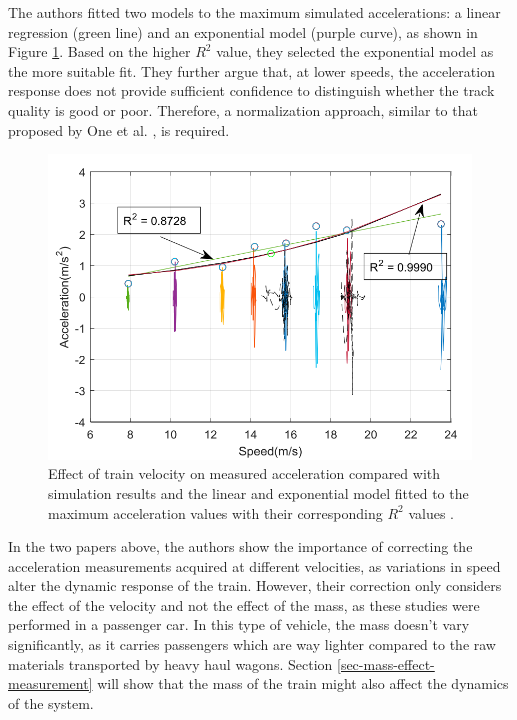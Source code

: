 The authors fitted two models to the maximum simulated accelerations: a linear regression (green line) and an exponential model (purple curve), as shown in Figure \ref{fig:vel_effect_balouchi}. Based on the higher $R^2$ value, they selected the exponential model as the more suitable fit. They further argue that, at lower speeds, the acceleration response does not provide sufficient confidence to distinguish whether the track quality is good or poor. Therefore, a normalization approach, similar to that proposed by One et al. \cite{Hironori_ONO202322-00239}, is required.

\begin{figure}[H]
    \centering
    \includegraphics[width=12cm]{Cap2_LitReview/Vel_effect/results_bia.png}
    \caption{Effect of train velocity on measured acceleration compared with simulation results and the linear and exponential model fitted to the maximum acceleration values with their corresponding $R^2$ values \cite{Balouchi02092021}.}
    \label{fig:vel_effect_balouchi}
\end{figure}

In the two papers above, the authors show the importance of correcting the acceleration measurements acquired at different velocities, as variations in speed alter the dynamic response of the train. However, their correction only considers the effect of the velocity and not the effect of the mass, as these studies were performed in a passenger car. In this type of vehicle, the mass doesn't vary significantly, as it carries passengers which are way lighter compared to the raw materials transported by heavy haul wagons. Section \ref{sec-mass-effect-measurement} will show that the mass of the train might also affect the dynamics of the system.

